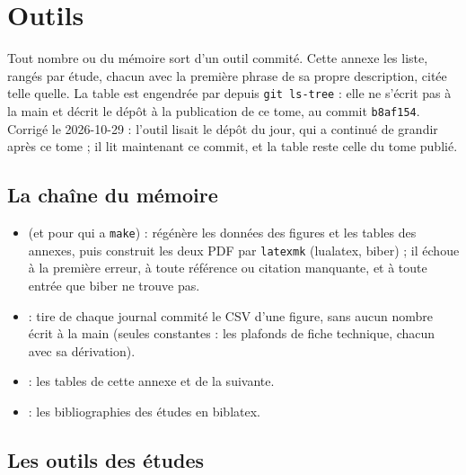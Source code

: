 \chapter{Outils}\label{ann:outils}

Tout nombre \mes{} ou \calc{} du mémoire sort d'un outil commité. Cette annexe les liste, rangés par étude, chacun avec la première phrase de sa propre description, citée telle quelle. La table est engendrée par  depuis  \texttt{git ls-tree} : elle ne s'écrit pas à la main et  décrit le dépôt à la publication de ce tome, au commit \texttt{b8af154}. Corrigé le 2026-10-29 : l'outil lisait le dépôt du jour, qui a continué de grandir après ce tome ; il lit maintenant ce commit, et la table reste celle du tome publié.

\section{La chaîne du mémoire}

\begin{itemize}
\item {} (et  pour qui a \texttt{make}) : régénère les données des figures et les tables des annexes, puis construit les deux PDF par \texttt{latexmk} (lualatex, biber) ; il échoue à la première erreur, à toute référence ou citation manquante, et à toute entrée que biber ne trouve pas.
\item {} : tire de chaque journal commité le CSV d'une figure, sans aucun nombre écrit à la main (seules constantes : les plafonds de fiche technique, chacun avec sa dérivation).
\item {} : les tables de cette annexe et de la suivante.
\item {} : les bibliographies des études en biblatex.
\end{itemize}

\section{Les outils des études}


